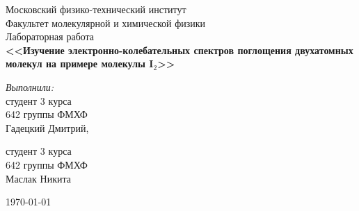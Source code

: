 \begin{titlepage}
\begin{center} 
 
\large Московский физико-технический институт\\
Факультет молекулярной и химической физики\\
\vspace{7cm}
\huge Лабораторная работа\\
\textbf{\Large <<Изучение электронно-колебательных спектров поглощения двухатомных молекул на примере молекулы I$_2$>>}\\
\end{center} 

\vspace{7.5cm}
{\par \raggedleft \large \emph{Выполнили:}\\ 
	студент 3 курса\\ 
	642 группы ФМХФ\\ 
	Гадецкий Дмитрий, \par
	студент 3 курса\\ 
	642 группы ФМХФ\\ 
	Маслак Никита \par
}
\begin{center}
\vfill \today
\date \today
\end{center}
\end{titlepage}
\newpage
